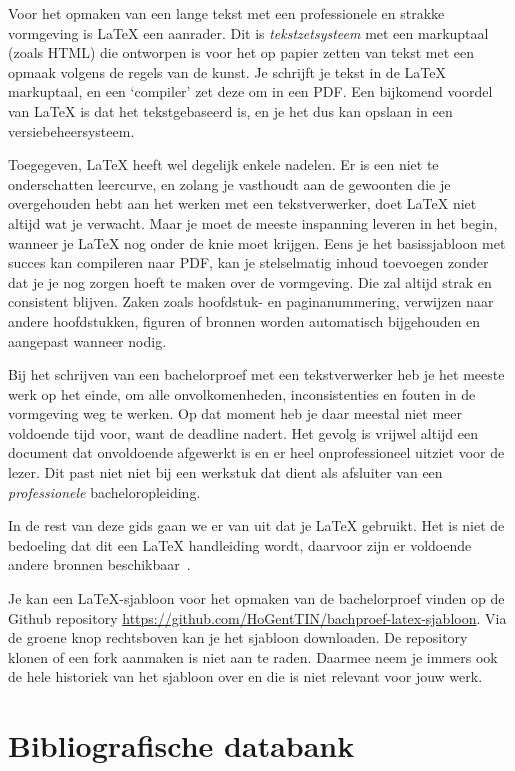 Voor het opmaken van een lange tekst met een professionele en strakke vormgeving is {\LaTeX} een aanrader. Dit is \emph{tekstzetsysteem} met een markuptaal (zoals HTML) die ontworpen is voor het op papier zetten van tekst met een opmaak volgens de regels van de kunst. Je schrijft je tekst in de {\LaTeX} markuptaal, en een `compiler' zet deze om in een PDF. Een bijkomend voordel van {\LaTeX} is dat het tekstgebaseerd is, en je het dus kan opslaan in een versiebeheersysteem.

Toegegeven, {\LaTeX} heeft wel degelijk enkele nadelen. Er is een niet te onderschatten leercurve, en zolang je vasthoudt aan de gewoonten die je overgehouden hebt aan het werken met een tekstverwerker, doet {\LaTeX} niet altijd wat je verwacht. Maar je moet de meeste inspanning leveren in het begin, wanneer je {\LaTeX} nog onder de knie moet krijgen. Eens je het basissjabloon met succes kan compileren naar PDF, kan je stelselmatig inhoud toevoegen zonder dat je je nog zorgen hoeft te maken over de vormgeving. Die zal altijd strak en consistent blijven. Zaken zoals hoofdstuk- en paginanummering, verwijzen naar andere hoofdstukken, figuren of bronnen worden automatisch bijgehouden en aangepast wanneer nodig.

Bij het schrijven van een bachelorproef met een tekstverwerker heb je het meeste werk op het einde, om alle onvolkomenheden, inconsistenties en fouten in de vormgeving weg te werken. Op dat moment heb je daar meestal niet meer voldoende tijd voor, want de deadline nadert. Het gevolg is vrijwel altijd een document dat onvoldoende afgewerkt is en er heel onprofessioneel uitziet voor de lezer. Dit past niet niet bij een werkstuk dat dient als afsluiter van een \textit{professionele} bacheloropleiding.

In de rest van deze gids gaan we er van uit dat je {\LaTeX} gebruikt. Het is niet de bedoeling dat dit een {\LaTeX} handleiding wordt, daarvoor zijn er voldoende andere bronnen beschikbaar~\parencite{Oetiker2015}.

Je kan een {\LaTeX}-sjabloon voor het opmaken van de bachelorproef vinden op de Github repository \url{https://github.com/HoGentTIN/bachproef-latex-sjabloon}. Via de groene knop rechtsboven kan je het sjabloon downloaden. De repository klonen of een fork aanmaken is niet aan te raden. Daarmee neem je immers ook de hele historiek van het sjabloon over en die is niet relevant voor jouw werk.

\section{Bibliografische databank}%
\label{sec:bibliografische-databank}

